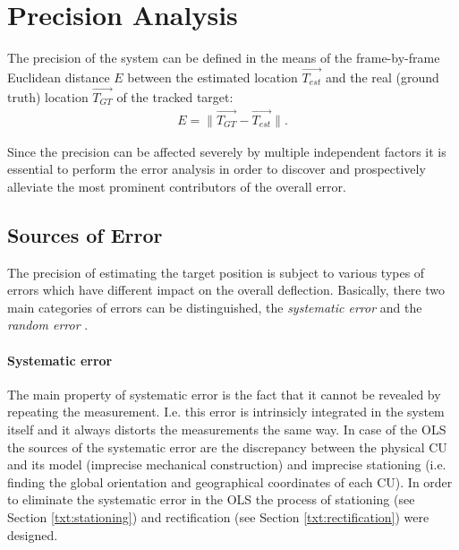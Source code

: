 \section{Precision Analysis} \label{txt:precision_analysis}

The precision of the system can be defined in the means of the frame-by-frame Euclidean distance $E$ between the estimated location $\vec{T_{est}}$ and the real (ground truth) location $\vec{T_{GT}}$ of the tracked target:
\begin{align}
	E = \lVert \vec{T_{GT}} - \vec{T_{est}} \rVert.
\end{align}

Since the precision can be affected severely by multiple independent factors it is essential to perform the error analysis in order to discover and prospectively alleviate the most prominent contributors of the overall error.

\subsection{Sources of Error}

The precision of estimating the target position is subject to various types of errors which have different impact on the overall deflection. Basically, there two main categories of errors can be distinguished, the \textit{systematic error} and the \textit{random error} \cite{taylor1997introduction}.

\paragraph{Systematic error} The main property of systematic error is the fact that it cannot be revealed by repeating the measurement. I.e. this error is intrinsicly integrated in the system itself and it always distorts the measurements the same way. In case of the OLS the sources of the systematic error are the discrepancy between the physical CU and its model (imprecise mechanical construction) and imprecise stationing (i.e. finding the global orientation and geographical coordinates of each CU). In order to eliminate the systematic error in the OLS the process of stationing (see Section \ref{txt:stationing}) and rectification (see Section \ref{txt:rectification}) were designed.

